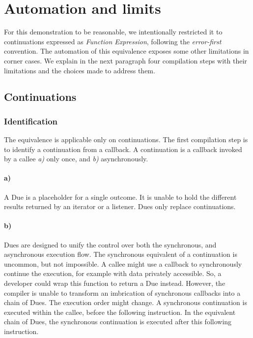 \section{Automation and limits} \label{section:limits}


For this demonstration to be reasonable, we intentionally restricted it to continuations expressed as \textit{Function Expression}, following the \textit{error-first} convention.
The automation of this equivalence exposes some other limitations in corner cases.
We explain in the next paragraph four compilation steps with their limitations and the choices made to address them.

\subsection{Continuations}

\subsubsection{Identification}

The equivalence is applicable only on continuations.
The first compilation step is to identify a continuation from a callback.
A continuation is a callback invoked by a callee \textit{a)} only once, and \textit{b)} asynchronously.

\paragraph{a)}
A Due is a placeholder for a single outcome.
It is unable to hold the different results returned by an iterator or a listener.
Dues only replace continuations.

\paragraph{b)}
Dues are designed to unify the control over both the synchronous, and asynchronous execution flow.
The synchronous equivalent of a continuation is uncommon, but not impossible.
A callee might use a callback to synchronously continue the execution, for example with data privately accessible.
So, a developer could wrap this function to return a Due instead.
However, the compiler is unable to transform an imbrication of synchronous callbacks into a chain of Dues.
The execution order might change.
A synchronous continuation is executed within the callee, before the following instruction.
In the equivalent chain of Dues, the synchronous continuation is executed after this following instruction.


